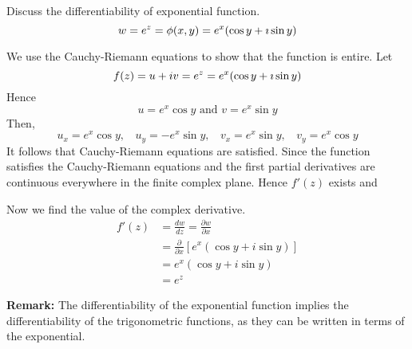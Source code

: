 \begin{example}
  Discuss  the differentiability of  exponential function.
  \[  w= e^z = \phi(x,y) = e^x (\cos y + \imath \sin y)  \]
 \end{example}
 \begin{solution}
  We use the Cauchy-Riemann equations to show that the function is entire. Let 
 \[f(z) = u+iv = e^z =  e^x (\cos y + \imath \sin y)\]
 Hence
 \[ u =e^x \cos y \text{   and   } v = e^x \sin y\]
 Then,
 \[u_x =e^x \cos y, ~~~~u_y= -e^x \sin y, ~~~~v_x=e^x \sin y, ~~~~v_y=e^x \cos y \] 
 It follows that Cauchy-Riemann equations are satisfied. Since the function satisfies the Cauchy-Riemann equations and the first partial derivatives are continuous everywhere in the finite complex plane. Hence $f'(z)$ exists and
 
Now we find the value of the complex derivative.
\begin{align*}
        f'(z) &= \frac{dw}{dz} = \frac{\partial w}{\partial x} \\
         &=  \frac{\partial}{\partial x}[e^x(\cos y + i \sin y)] \\
         &=  e^x(\cos y + i \sin y) \\
         &=e^z
\end{align*}
\end{solution}

\textbf{Remark: }The differentiability of the exponential function implies the  differentiability of the trigonometric functions, as they can be written
  in terms of the exponential.
  
